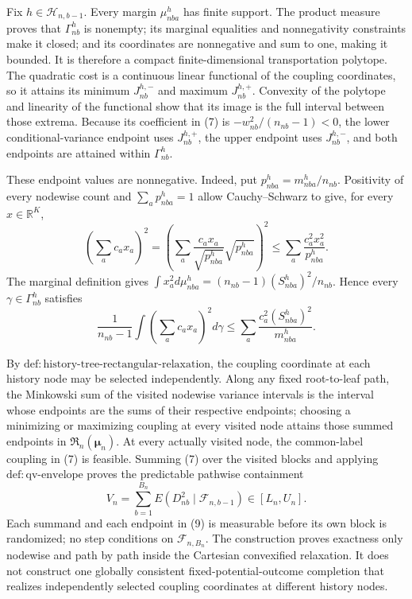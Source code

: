 Fix \(h\in\mathcal H_{n,b-1}\). Every margin \(\mu_{nba}^h\) has finite support. The product measure proves that \(\Gamma_{nb}^h\) is nonempty; its marginal equalities and nonnegativity constraints make it closed; and its coordinates are nonnegative and sum to one, making it bounded. It is therefore a compact finite-dimensional transportation polytope. The quadratic cost is a continuous linear functional of the coupling coordinates, so it attains its minimum \(J_{nb}^{h,-}\) and maximum \(J_{nb}^{h,+}\). Convexity of the polytope and linearity of the functional show that its image is the full interval between those extrema. Because its coefficient in (7) is \(-w_{nb}^2/(n_{nb}-1)<0\), the lower conditional-variance endpoint uses \(J_{nb}^{h,+}\), the upper endpoint uses \(J_{nb}^{h,-}\), and both endpoints are attained within \(\Gamma_{nb}^h\).

These endpoint values are nonnegative. Indeed, put \(p_{nba}^h=m_{nba}^h/n_{nb}\). Positivity of every nodewise count and \(\sum_a p_{nba}^h=1\) allow Cauchy--Schwarz to give, for every \(x\in\mathbb R^K\),
\[
\left(\sum_ac_ax_a\right)^2
=\left(\sum_a\frac{c_ax_a}{\sqrt{p_{nba}^h}}\sqrt{p_{nba}^h}\right)^2
\le\sum_a\frac{c_a^2x_a^2}{p_{nba}^h}.
\]
The marginal definition gives
\(
\int x_a^2d\mu_{nba}^h=(n_{nb}-1)(S_{nba}^h)^2/n_{nb}
\). Hence every \(\gamma\in\Gamma_{nb}^h\) satisfies
\[
\frac1{n_{nb}-1}\int\left(\sum_ac_ax_a\right)^2d\gamma
\le\sum_a\frac{c_a^2(S_{nba}^h)^2}{m_{nba}^h}.
\tag{8}
\]

By \(\mathrm{def:history\text{-}tree\text{-}rectangular\text{-}relaxation}\), the coupling coordinate at each history node may be selected independently. Along any fixed root-to-leaf path, the Minkowski sum of the visited nodewise variance intervals is the interval whose endpoints are the sums of their respective endpoints; choosing a minimizing or maximizing coupling at every visited node attains those summed endpoints in \(\mathfrak R_n(\boldsymbol\mu_n)\). At every actually visited node, the common-label coupling in (7) is feasible. Summing (7) over the visited blocks and applying \(\mathrm{def:qv\text{-}envelope}\) proves the predictable pathwise containment
\[
V_n=\sum_{b=1}^{B_n}E(D_{nb}^2\mid\mathcal F_{n,b-1})\in[L_n,U_n].
\tag{9}
\]
Each summand and each endpoint in (9) is measurable before its own block is randomized; no step conditions on \(\mathcal F_{n,B_n}\). The construction proves exactness only nodewise and path by path inside the Cartesian convexified relaxation. It does not construct one globally consistent fixed-potential-outcome completion that realizes independently selected coupling coordinates at different history nodes.

